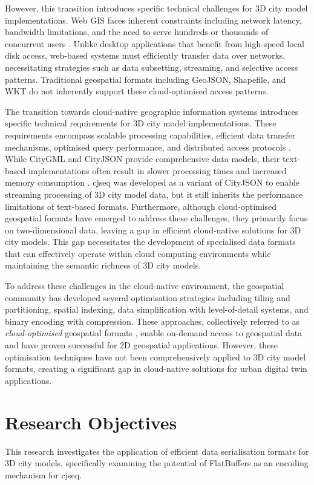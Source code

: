 However, this transition introduces specific technical challenges for 3D city model implementations.
Web GIS faces inherent constraints including network latency, bandwidth limitations, and the need to serve hundreds or thousands of concurrent users \citep{alesheikh_2002}.
Unlike desktop applications that benefit from high-speed local disk access, web-based systems must efficiently transfer data over networks, necessitating strategies such as data subsetting, streaming, and selective access patterns.
Traditional geospatial formats including GeoJSON, Shapefile, and WKT do not inherently support these cloud-optimised access patterns.

The transition towards cloud-native geographic information systems introduces specific technical requirements for 3D city model implementations.
These requirements encompass scalable processing capabilities, efficient data transfer mechanisms, optimised query performance, and distributed access protocols \citep{cloud-optimised-formats}.
While CityGML and CityJSON provide comprehensive data models, their text-based implementations often result in slower processing times and increased memory consumption \citep{jordi_van_liempt_2020}. \ac{cjseq} was developed as a variant of CityJSON to enable streaming processing of 3D city model data, but it still inherits the performance limitations of text-based formats.
Furthermore, although cloud-optimised geospatial formats have emerged to address these challenges, they primarily focus on two-dimensional data, leaving a gap in efficient cloud-native solutions for 3D city models.
This gap necessitates the development of specialised data formats that can effectively operate within cloud computing environments while maintaining the semantic richness of 3D city models.

To address these challenges in the cloud-native environment, the geospatial community has developed several optimisation strategies including tiling and partitioning, spatial indexing, data simplification with level-of-detail systems, and binary encoding with compression.
These approaches, collectively referred to as \emph{cloud-optimised} geospatial formats \citep{cloud-optimised-formats}, enable on-demand access to geospatial data and have proven successful for 2D geospatial applications.
However, these optimisation techniques have not been comprehensively applied to 3D city model formats, creating a significant gap in cloud-native solutions for urban digital twin applications.

\section{Research Objectives}
\label{introduction:research_objectives}
This research investigates the application of efficient data serialisation formats for 3D city models, specifically examining the potential of FlatBuffers \citep{flatbuffers} as an encoding mechanism for \ac{cjseq}.

